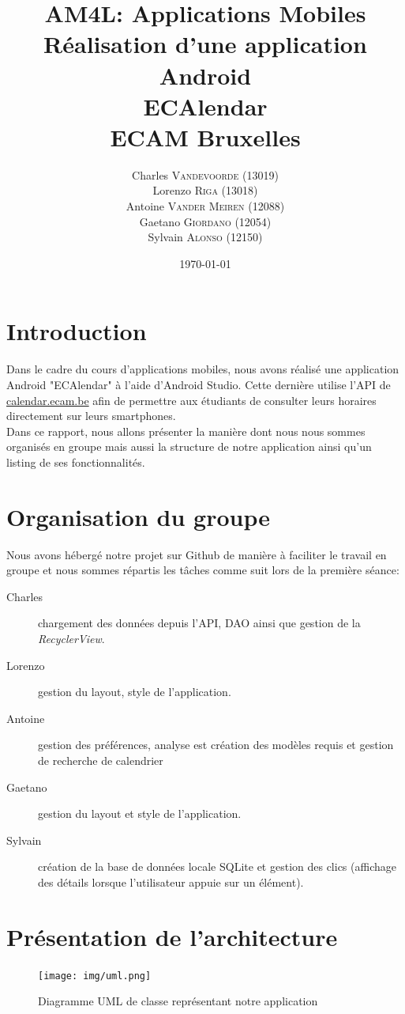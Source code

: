 \documentclass{article}
\title{AM4L: Applications Mobiles \\ Réalisation d'une application Android \\ ECAlendar \\
\vspace{1cm} \large{ECAM Bruxelles} \vspace{5cm}}
\author{Charles \textsc{Vandevoorde} (13019)\\
		Lorenzo \textsc{Riga} (13018)\\
		Antoine \textsc{Vander Meiren} (12088)\\
		Gaetano \textsc{Giordano} (12054)\\
		Sylvain \textsc{Alonso} (12150)\\}
\date{\vspace{5cm}\today}
\begin{document}
	\maketitle
    \newpage


	\section{Introduction}
    Dans le cadre du cours d'applications mobiles, nous avons réalisé une application Android
    "ECAlendar" à l'aide d'Android Studio. Cette dernière utilise l'API de \url{calendar.ecam.be} afin de
    permettre aux étudiants de consulter leurs horaires directement sur leurs smartphones.\\

    Dans ce rapport, nous allons présenter la manière dont nous nous sommes organisés en groupe mais
    aussi la structure de notre application ainsi qu'un listing de ses fonctionnalités.

	\section{Organisation du groupe}
     Nous avons hébergé notre projet sur Github de manière à faciliter le travail en groupe et nous
     sommes répartis les tâches comme suit lors de la première séance:
	 \begin{description}
         \item[Charles] chargement des données depuis l'API, DAO ainsi que gestion de la
             \textit{RecyclerView}.
         \item[Lorenzo] gestion du layout, style de l'application.
         \item[Antoine] gestion des préférences, analyse est création des modèles requis et gestion de recherche de calendrier
         \item[Gaetano] gestion du layout et style de l'application.
         \item[Sylvain] création de la base de données locale SQLite et gestion des clics (affichage des détails lorsque l'utilisateur appuie sur un élément).
	 \end{description}


	\section{Présentation de l'architecture}
        \begin{figure}
            \centering
            \texttt{[image: img/uml.png]}
            \label{fig:uml}
            \caption{Diagramme UML de classe représentant notre application}
        \end{figure}
\end{document}
